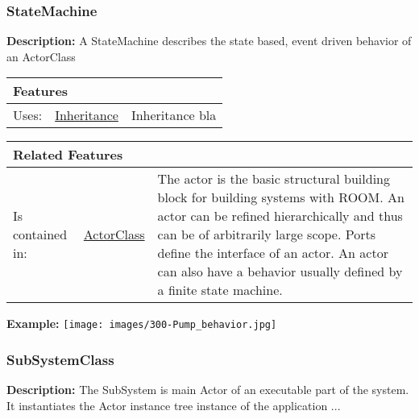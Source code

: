 		\subsubsection{\huge StateMachine}
			\hypertarget{ref:StateMachine}{}
			
			\textbf{Description:} A StateMachine describes the state based, event driven behavior of an ActorClass
			
			
			\begingroup
			\renewcommand{\arraystretch}{1.8} %
			\begin{longtable}{p{2.5cm}|p{4cm} p{}}
				\multicolumn{2}{l}{\textbf{\large Features}} & \\
				\hline
			Uses: & \tabitem \hyperlink{ref:Inheritance}{Inheritance}  & Inheritance bla\\
			\hline
			\end{longtable}
			\endgroup
			
			\begingroup
			\renewcommand{\arraystretch}{1.8} %
			\begin{longtable}{p{2.5cm}|p{4cm} p{}}
				\multicolumn{2}{l}{\textbf{\large Related Features}} & \\
				\hline
			Is contained in: & \tabitem \hyperlink{ref:ActorClass}{ActorClass}  & The actor is the basic structural building block for building systems with ROOM. An actor can be refined hierarchically and thus can be of arbitrarily large scope. Ports define the interface of an actor. An actor can also have a behavior usually defined by a finite state machine. \\
			\hline
			\end{longtable}
			\endgroup
			
			
			\textbf{Example:} 
				\texttt{[image: images/300-Pump\_behavior.jpg]}
		
		\vspace{\baselineskip}
		\vspace{\baselineskip}
		\vspace{\baselineskip}
		
		\subsubsection{\huge SubSystemClass}
			\hypertarget{ref:SubSystemClass}{}
			
			\textbf{Description:} The SubSystem is main Actor of an executable part of the system. It instantiates the Actor instance tree instance of the application ...
				
